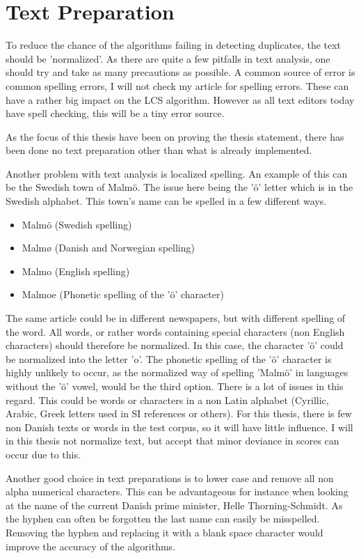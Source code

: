 \section{Text Preparation}
\label{TextPrep}
To reduce the chance of the algorithms failing in detecting duplicates, the text should be 'normalized'. As there are quite a few pitfalls in text analysis, one should try and take as many precautions as possible. A common source of error is common spelling errors, I will not check my article for spelling errors. These can have a rather big impact on the LCS algorithm. However as all text editors today have spell checking, this will be a tiny error source.

As the focus of this thesis have been on proving the thesis statement, there has been done no text preparation other than what is already implemented.

Another problem with text analysis is localized spelling. An example of this can be the Swedish town of Malmö. The issue here being the 'ö' letter which is in the Swedish alphabet. This town's name can be spelled in a few different ways.


\begin{itemize}
\item Malmö (Swedish spelling)
\item Malmø (Danish and Norwegian spelling)
\item Malmo (English spelling)
\item Malmoe (Phonetic spelling of the 'ö' character)
\end{itemize}

The same article could be in different newspapers, but with different spelling of the word. All words, or rather words containing special characters (non English characters) should therefore be normalized. In this case, the character 'ö' could be normalized into the letter 'o'. The phonetic spelling of the 'ö' character is highly unlikely to occur, as the normalized way of spelling 'Malmö' in languages without the 'ö' vowel, would be the third option. There is a lot of issues in this regard. This could be words or characters in a non Latin alphabet (Cyrillic, Arabic, Greek letters used in SI references or others). For this thesis, there is few non Danish texts or words in the test corpus, so it will have little influence. I will in this thesis not normalize text, but accept that minor deviance in scores can occur due to this.

Another good choice in text preparations is to lower case and remove all non alpha numerical characters. This can be advantageous for instance when looking at the name of the current Danish prime minister, Helle Thorning-Schmidt. As the hyphen can often be forgotten the last name can easily be misspelled. Removing the hyphen and replacing it with a blank space character would improve the accuracy of the algorithms. 

